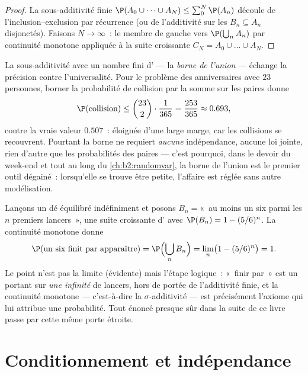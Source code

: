 \begin{proof}
La sous-additivité finie $\P(A_0 \cup \dots \cup A_N) \leq
\sum_0^N \P(A_n)$ découle de l'inclusion--exclusion par récurrence
(ou de l'additivité sur les $B_n \subseteq A_n$ disjonctés).
Faisons $N \to \infty$~: le membre de gauche  vers
$\P(\bigcup_n A_n)$ par continuité monotone appliquée à la suite
croissante $C_N = A_0 \cup \dots \cup A_N$.
\end{proof}

\begin{example}\label{ex:b2:proba:unionbound}
La sous-additivité avec un nombre fini d' --- la \emph{borne de
l'union} --- échange la précision contre l'universalité. Pour le
problème des anniversaires avec $23$ personnes, borner la probabilité de
collision par la somme sur les paires donne
\[
\P(\text{collision}) \leq \binom{23}2\cdot\frac1{365}
= \frac{253}{365} \approx 0.693 ,
\]
contre la vraie valeur $0.507$~: éloignée d'une large marge, car les
collisions se recouvrent. Pourtant la borne ne requiert \emph{aucune}
indépendance, aucune loi jointe, rien d'autre que les probabilités des
paires --- c'est pourquoi, dans le devoir du week-end et tout au long du
\cref{ch:b2:randomvar}, la borne de l'union est le premier outil
dégainé~: lorsqu'elle se trouve être petite, l'affaire est réglée sans
autre modélisation.
\end{example}

\begin{example}\label{ex:b2:proba:sixeventually}
Lançons un dé équilibré indéfiniment et posons $B_n = {}$«~au moins un six
parmi les $n$ premiers lancers~», une suite croissante d'
avec $\P(B_n) = 1 - (5/6)^n$. La continuité monotone donne
\[
\P(\text{un six finit par apparaître})
= \P\Bigl(\bigcup_nB_n\Bigr)
= \lim_n\bigl(1 - (5/6)^n\bigr) = 1 .
\]
Le point n'est pas la limite (évidente) mais l'étape logique~:
«~finir par~» est un  portant sur \emph{une infinité} de
lancers, hors de portée de l'additivité finie, et la continuité
monotone --- c'est-à-dire la $\sigma$-additivité --- est précisément
l'axiome qui lui attribue une probabilité. Tout énoncé presque sûr dans
la suite de ce livre passe par cette même porte étroite.
\end{example}

\section{Conditionnement et indépendance}

